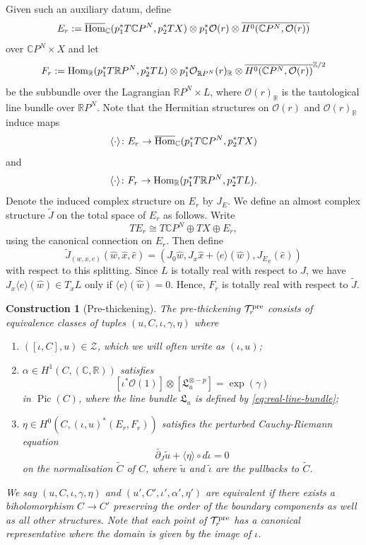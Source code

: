 \documentclass[11pt,psamsfonts, oneside, reqno]{amsart}
\newcommand{\cc}[1]{\overline{#1}}
\newcommand{\g}{\circ}%
\newcommand{\cl}{\colon}
\newcommand{\lspan}[1]{\langle {#1}\rangle}
\newcommand{\delbar}{\bar\partial}
\newcommand{\Hom}{\normalfont\text{Hom}}
\newcommand{\bC}{\mathbb{C}}
\newcommand{\bR}{\mathbb{R}}
\newcommand{\bZ}{\mathbb{Z}}
\newcommand{\cO}{\mathcal{O}}
\newcommand{\cT}{\mathcal{T}}
\newcommand{\cZ}{\mathcal{Z}}
\newcommand{\fL}{\mathfrak{L}}
\newcommand{\wt}{\widetilde}
\newcommand{\wh}{\widehat}
\newtheorem{construction}[theorem]{Construction}
\theoremstyle{definition}
\theoremstyle{remark}
\numberwithin{equation}{section}
\DeclareMathOperator{\Pic}{Pic}
\begin{document}
\noindent
Given such an auxiliary datum, define 
\begin{equation}\label{eq:perturbation-bundle}
	E_r := \cc{\Hom}_\bC(p_1^*T{\bC P^N},p_2^*TX) \otimes p_1^*\cO(r)\otimes \cc{H^0(\bC P^N,\cO(r))}
\end{equation}
over $\bC P^N\times X$ and let 
$$F_r := \Hom_\bR(p_1^*T{\bR P^N},p_2^*TL) \otimes p_1^*\cO_{\bR P^N}(r)_\bR\otimes \cc{H^0(\bC P^N,\cO(r))}^{\bZ/2}$$
be the subbundle over the Lagrangian $\bR P^N\times L$, where $\cO(r)_\bR$ is the tautological line bundle over $\bR P^N$. Note that the Hermitian structures on $\cO(r)$ and $\cO(r)_\bR$ induce maps $$\lspan{\cdot}\cl E_r\to \cc{\Hom}_\bC(p_1^*T{\bC P^N},p_2^*TX)$$ 
and 
\[\lspan{\cdot}\cl F_r \to \Hom_\bR(p_1^*T{\bR P^N},p_2^*TL).\]
Denote the induced complex structure on $E_r$ by $J_E$. We define an almost complex structure $\wt J$ on the total space of $E_r$ as follows. Write $$TE_r \cong T\bC P^N\oplus TX\oplus E_r,$$ 
using the canonical connection on $E_r$. 
Then define 
$$\wt J_{(w,x,e)}(\hat{w},\hat{x},\hat{e}) = (J_0\hat{w},J_x\hat{x}+\lspan{e}(\hat{w}),{J_E}_e(\hat{e}))$$
with respect to this splitting. Since $L$ is totally real with respect to $J$, we have $J_x\lspan{e}(\wh w) \in T_xL$ only if $\lspan{e}(\wh w) = 0$. Hence, $F_r$ is totally real with respect to $\wt J$. 


\begin{construction}[Pre-thickening]\label{construction-thickening}	The \emph{pre-thickening} $\cT^{\normalfont\text{pre}}_r$ consists of equivalence classes of tuples $(u,C,\iota,\gamma,\eta)$ where 
	\begin{enumerate}[label=\roman*),leftmargin=20pt,ref=\roman*]
		\item $([\iota,C],u)\in \cZ$, which we will often write as $(\iota,u)$;
		\item $\alpha\in H^1(C,(\bC,\bR))$ satisfies 
		$$[\iota^*\cO(1)]\otimes [\fL_u^{\otimes -p}] = \exp(\gamma)$$ 
		in $\Pic(C)$, where the line bundle $\fL_u$ is defined by \eqref{eq:real-line-bundle};
		\item $\eta \in H^0(C,(\iota,u)^*(E_r,F_r))$ satisfies the perturbed Cauchy-Riemann equation 
		\begin{equation}\label{eq:perturbed-cr}\delbar_J \wt{u} + \lspan{\eta}\g d\wt{\iota} = 0 \end{equation}
		on the normalisation $\wt{C}$ of $C$, where $\wt u$ and $\wt \iota$ are the pullbacks to $\wt C$.
	\end{enumerate}
	We say $(u,C,\iota,\gamma,\eta)$ and $(u',C',\iota',\alpha',\eta')$ are \emph{equivalent} if there exists a biholomorphism $C\to C'$ preserving the order of the boundary components as well as all other structures. Note that each point of $\cT^{\normalfont\text{pre}}_r$ has a canonical representative where the domain is given by the image of $\iota$. 
\end{construction}
\end{document}
